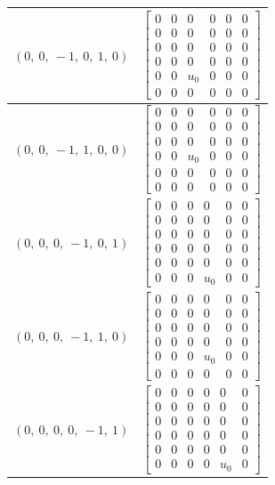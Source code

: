 \documentclass[11pt]{article}
\theoremstyle{definition}
\begin{document}
\begin{longtable}{|l|c|}
    \hline
    $\left( 0, \  0, \  -1, \  0, \  1, \  0\right)$ & ${\left[\begin{matrix}0 & 0 & 0 & 0 & 0 & 0\\0 & 0 & 0 & 0 & 0 & 0\\0 & 0 & 0 & 0 & 0 & 0\\0 & 0 & 0 & 0 & 0 & 0\\0 & 0 & u_{0} & 0 & 0 & 0\\0 & 0 & 0 & 0 & 0 & 0\end{matrix}\right]}$ \\
    \hline
    $\left( 0, \  0, \  -1, \  1, \  0, \  0\right)$ & ${\left[\begin{matrix}0 & 0 & 0 & 0 & 0 & 0\\0 & 0 & 0 & 0 & 0 & 0\\0 & 0 & 0 & 0 & 0 & 0\\0 & 0 & u_{0} & 0 & 0 & 0\\0 & 0 & 0 & 0 & 0 & 0\\0 & 0 & 0 & 0 & 0 & 0\end{matrix}\right]}$ \\
    \hline
    $\left( 0, \  0, \  0, \  -1, \  0, \  1\right)$ & ${\left[\begin{matrix}0 & 0 & 0 & 0 & 0 & 0\\0 & 0 & 0 & 0 & 0 & 0\\0 & 0 & 0 & 0 & 0 & 0\\0 & 0 & 0 & 0 & 0 & 0\\0 & 0 & 0 & 0 & 0 & 0\\0 & 0 & 0 & u_{0} & 0 & 0\end{matrix}\right]}$ \\
    \hline
    $\left( 0, \  0, \  0, \  -1, \  1, \  0\right)$ & ${\left[\begin{matrix}0 & 0 & 0 & 0 & 0 & 0\\0 & 0 & 0 & 0 & 0 & 0\\0 & 0 & 0 & 0 & 0 & 0\\0 & 0 & 0 & 0 & 0 & 0\\0 & 0 & 0 & u_{0} & 0 & 0\\0 & 0 & 0 & 0 & 0 & 0\end{matrix}\right]}$ \\
    \hline
    $\left( 0, \  0, \  0, \  0, \  -1, \  1\right)$ & ${\left[\begin{matrix}0 & 0 & 0 & 0 & 0 & 0\\0 & 0 & 0 & 0 & 0 & 0\\0 & 0 & 0 & 0 & 0 & 0\\0 & 0 & 0 & 0 & 0 & 0\\0 & 0 & 0 & 0 & 0 & 0\\0 & 0 & 0 & 0 & u_{0} & 0\end{matrix}\right]}$ \\

\end{longtable}
\end{document}
